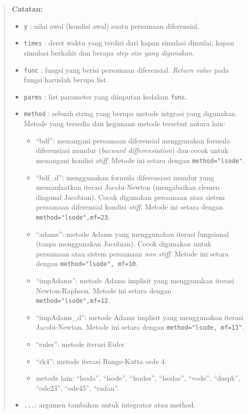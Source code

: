 \documentclass[
]{book}
\providecommand{\tightlist}{%
  \setlength{\itemsep}{0pt}\setlength{\parskip}{0pt}}
\theoremstyle{definition}
\theoremstyle{definition}
\theoremstyle{definition}
\theoremstyle{definition}
\theoremstyle{remark}
\begin{document}
\begin{quote}
\textbf{Catatan:}

\begin{itemize}
\item
  \texttt{y} : nilai awal (kondisi awal) suatu persamaan diferensial.
\item
  \texttt{times} : deret waktu yang terdiri dari kapan simulasi dimulai, kapan simulasi berkahir dan berapa \emph{step size yang digunakan}.
\item
  \texttt{func} : fungsi yang berisi persamaan diferensial. \emph{Return value} pada fungsi haruslah berupa list.
\item
  \texttt{parms} : list parameter yang diinputan kedalam \texttt{func}.
\item
  \texttt{method} : sebuah string yang berupa metode intgrasi yang digunakan. Metode yang tersedia dan kegunaan metode tersebut antara lain:

  \begin{itemize}
  \tightlist
  \item
    ``bdf'': menangani persamaan diferensial menggunakan formula diferensiasi mundur (\emph{bacward differensiation}) dan cocok untuk menangani kondisi \emph{stiff}. Metode ini setara dengan \texttt{method="lsode"}.
  \item
    ``bdf\_d'': menggunakan formula diferensiasi mundur yang memanfaatkan iterasi Jacobi-Newton (mengabaikan elemen diagonal Jacobian). Cocok digunakan persamaan atau sistem persamaan diferensial kondisi \emph{stiff}. Metode ini setara dengan \texttt{method="lsode",mf=23}.
  \item
    ``adams'': metode Adams yang menggunakan iterasi fungsional (tanpa menggunakan Jacobian). Cocok digunakan untuk persamaan atau sistem persamaan \emph{non stiff}. Metode ini setara dengan \texttt{method="lsode",\ mf=10}.
  \item
    ``impAdams'': metode Adams implisit yang menggunakan iterasi Newton-Raphson. Metode ini setara dengan \texttt{method="lsode",mf=12}.
  \item
    ``impAdams\_d'': metode Adams implisit yang menggunakan iterasi Jacobi-Newton. Metode ini setara dengan \texttt{method="lsode,\ mf=13"}.
  \item
    ``euler'': metode iterasi Euler
  \item
    ``rk4'': metode iterasi Runge-Kutta orde 4.
  \item
    metode lain: ``lsoda'', ``lsode'', ``lsodes'', ``lsodar'', ``vode'', ``daspk'', ``ode23'', ``ode45'', ``radau''.
  \end{itemize}
\item
  \texttt{...}: argumen tambahan untuk integrator atau method.
\end{itemize}
\end{quote}
\end{document}
